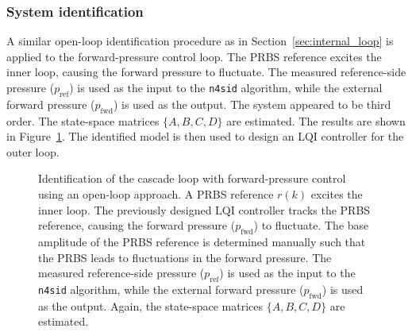 \documentclass[12pt,a4paper]{article}
\begin{document}
\subsubsection{System identification}
A similar open-loop identification procedure as in Section~\ref{sec:internal_loop} is applied to the forward-pressure control loop. The PRBS reference excites the inner loop, causing the forward pressure to fluctuate. The measured reference-side pressure ($p_{\mathrm{ref}}$) is used as the input to the \texttt{n4sid} algorithm, while the external forward pressure ($p_{\mathrm{fwd}}$) is used as the output. The system appeared to be third order. The state-space matrices $\{A, B, C, D\}$ are estimated. The results are shown in Figure~\ref{fig:forward_pressure_identification}. The identified model is then used to design an LQI controller for the outer loop.
\begin{figure}[h!]
    \centering
    
    \caption{Identification of the cascade loop with forward-pressure control using an open-loop approach. A PRBS reference $r(k)$ excites the inner loop. The previously designed LQI controller tracks the PRBS reference, causing the forward pressure ($p_{\mathrm{fwd}}$) to fluctuate. The base amplitude of the PRBS reference is determined manually such that the PRBS leads to fluctuations in the forward pressure. The measured reference-side pressure ($p_{\mathrm{ref}}$) is used as the input to the \texttt{n4sid} algorithm, while the external forward pressure ($p_{\mathrm{fwd}}$) is used as the output. Again, the state-space matrices $\{A, B, C, D\}$ are estimated.}
    \label{fig:forward_pressure_identification}
\end{figure}

\newpage
\end{document}
